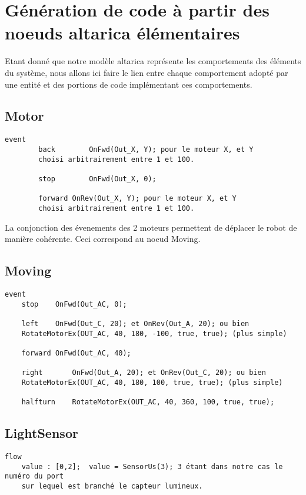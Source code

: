 \section{Génération de code à partir des noeuds altarica élémentaires}

Etant donné que notre modèle altarica représente les comportements des éléments du système, nous allons ici faire le lien entre chaque comportement adopté par une entité et des portions de code implémentant ces comportements.

\subsection{Motor}

\begin{verbatim}
event
    	back		OnFwd(Out_X, Y); pour le moteur X, et Y 
    	choisi arbitrairement entre 1 et 100.
    	
    	stop		OnFwd(Out_X, 0);
    	
    	forward	OnRev(Out_X, Y); pour le moteur X, et Y 
    	choisi arbitrairement entre 1 et 100.

\end{verbatim}

La conjonction des évenements des 2 moteurs permettent de déplacer le robot de manière cohérente. Ceci correspond au noeud Moving.

\subsection{Moving}

\begin{verbatim}
event
	stop	OnFwd(Out_AC, 0);
	
	left	OnFwd(Out_C, 20); et OnRev(Out_A, 20); ou bien 
	RotateMotorEx(OUT_AC, 40, 180, -100, true, true); (plus simple)
	
	forward	OnFwd(Out_AC, 40);
	
	right		OnFwd(Out_A, 20); et OnRev(Out_C, 20); ou bien 
	RotateMotorEx(OUT_AC, 40, 180, 100, true, true); (plus simple)
	
	halfturn	RotateMotorEx(OUT_AC, 40, 360, 100, true, true);
\end{verbatim}

\subsection{LightSensor}

\begin{verbatim}
flow
    value : [0,2];	value = SensorUs(3); 3 étant dans notre cas le numéro du port 
    sur lequel est branché le capteur lumineux.
\end{verbatim}

